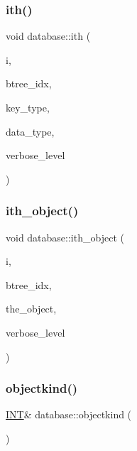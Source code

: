 \subsubsection{\texorpdfstring{ith()}{ith()}}
{\footnotesize\ttfamily void database\+::ith (\begin{DoxyParamCaption}\item[{\mbox{\hyperlink{galois_8h_a09fddde158a3a20bd2dcadb609de11dc}{I\+NT}}}]{i,  }\item[{\mbox{\hyperlink{galois_8h_a09fddde158a3a20bd2dcadb609de11dc}{I\+NT}}}]{btree\+\_\+idx,  }\item[{\mbox{\hyperlink{discreta_8h_a535c8df88e5939fd8a1a3d083e75124a}{K\+E\+Y\+T\+Y\+PE}} $\ast$}]{key\+\_\+type,  }\item[{\mbox{\hyperlink{discreta_8h_abf512b6b30146dda9c59049478bf3e99}{D\+A\+T\+A\+T\+Y\+PE}} $\ast$}]{data\+\_\+type,  }\item[{\mbox{\hyperlink{galois_8h_a09fddde158a3a20bd2dcadb609de11dc}{I\+NT}}}]{verbose\+\_\+level }\end{DoxyParamCaption})}

\mbox{\label{classdatabase_a1516bb38a4c846172354291271700d07}} 
\subsubsection{\texorpdfstring{ith\+\_\+object()}{ith\_object()}}
{\footnotesize\ttfamily void database\+::ith\+\_\+object (\begin{DoxyParamCaption}\item[{\mbox{\hyperlink{galois_8h_a09fddde158a3a20bd2dcadb609de11dc}{I\+NT}}}]{i,  }\item[{\mbox{\hyperlink{galois_8h_a09fddde158a3a20bd2dcadb609de11dc}{I\+NT}}}]{btree\+\_\+idx,  }\item[{\mbox{\hyperlink{class_vector}{Vector}} \&}]{the\+\_\+object,  }\item[{\mbox{\hyperlink{galois_8h_a09fddde158a3a20bd2dcadb609de11dc}{I\+NT}}}]{verbose\+\_\+level }\end{DoxyParamCaption})}

\mbox{\label{classdatabase_a5b9b82f6cd851fb8826ed68085233c2d}} 
\subsubsection{\texorpdfstring{objectkind()}{objectkind()}}
{\footnotesize\ttfamily \mbox{\hyperlink{galois_8h_a09fddde158a3a20bd2dcadb609de11dc}{I\+NT}}\& database\+::objectkind (\begin{DoxyParamCaption}{ }\end{DoxyParamCaption})\hspace{0.3cm}{\ttfamily [inline]}}

